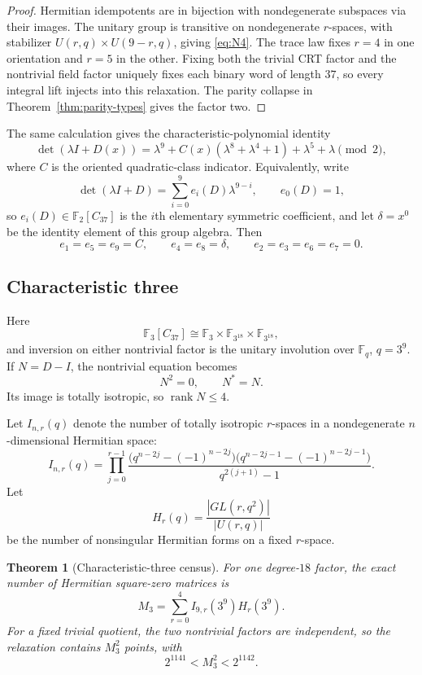 \documentclass[11pt]{article}
\newtheorem{theorem}{Theorem}[section]
\theoremstyle{definition}
\newcommand{\F}{\mathbb{F}}
\newcommand{\rank}{\operatorname{rank}}
\begin{document}
\begin{proof}
Hermitian idempotents are in bijection with nondegenerate subspaces via
their images.  The unitary group is transitive on nondegenerate
\(r\)-spaces, with stabilizer \(U(r,q)\times U(9-r,q)\), giving
\eqref{eq:N4}.  The trace law fixes \(r=4\) in one orientation and \(r=5\)
in the other.  Fixing both the trivial CRT factor and the nontrivial field
factor uniquely fixes each binary word of length \(37\), so every integral
lift injects into this relaxation.  The parity collapse in
Theorem~\ref{thm:parity-types} gives the factor two.
\end{proof}

The same calculation gives the characteristic-polynomial identity
\[
\det(\lambda I+D(x))
=\lambda^9+C(x)(\lambda^8+\lambda^4+1)+\lambda^5+\lambda
\pmod2,
\tag{5.6}\label{eq:char2-characteristic}
\]
where \(C\) is the oriented quadratic-class indicator.  Equivalently,
write
\[
\det(\lambda I+D)=\sum_{i=0}^{9}e_i(D)\lambda^{9-i},
\qquad e_0(D)=1,
\]
so \(e_i(D)\in\F_2[C_{37}]\) is the \(i\)th elementary symmetric
coefficient, and let \(\delta=x^0\) be the identity element of this group
algebra.  Then
\[
e_1=e_5=e_9=C,\qquad
e_4=e_8=\delta,\qquad
e_2=e_3=e_6=e_7=0.
\tag{5.7}\label{eq:char2-minors}
\]

\subsection{Characteristic three}

Here
\[
 \F_3[C_{37}]
 \cong
 \F_3\times \F_{3^{18}}\times\F_{3^{18}},
\]
and inversion on either nontrivial factor is the unitary involution over
\(\F_q\), \(q=3^9\).  If \(N=D-I\), the nontrivial equation becomes
\[
 N^2=0,\qquad N^*=N.
\tag{5.8}\label{eq:char3-squarezero}
\]
Its image is totally isotropic, so \(\rank N\leq4\).

Let \(I_{n,r}(q)\) denote the number of totally isotropic \(r\)-spaces in
a nondegenerate \(n\)-dimensional Hermitian space:
\[
I_{n,r}(q)=
\prod_{j=0}^{r-1}
\frac{
\bigl(q^{n-2j}-(-1)^{n-2j}\bigr)
\bigl(q^{n-2j-1}-(-1)^{n-2j-1}\bigr)}
{q^{2(j+1)}-1}.
\tag{5.9}\label{eq:isotropic-count}
\]
Let
\[
H_r(q)=\frac{|GL(r,q^2)|}{|U(r,q)|}
\tag{5.10}\label{eq:hermitian-form-count}
\]
be the number of nonsingular Hermitian forms on a fixed \(r\)-space.

\begin{theorem}[Characteristic-three census]
\label{thm:mod3-count}
For one degree-\(18\) factor, the exact number of Hermitian square-zero
matrices is
\[
 M_3=\sum_{r=0}^{4}I_{9,r}(3^9)H_r(3^9).
\tag{5.11}\label{eq:M3}
\]
For a fixed trivial quotient, the two nontrivial factors are independent,
so the relaxation contains \(M_3^2\) points, with
\[
2^{1141}<M_3^2<2^{1142}.
\tag{5.12}\label{eq:M3-bound}
\]
\end{theorem}
\end{document}
